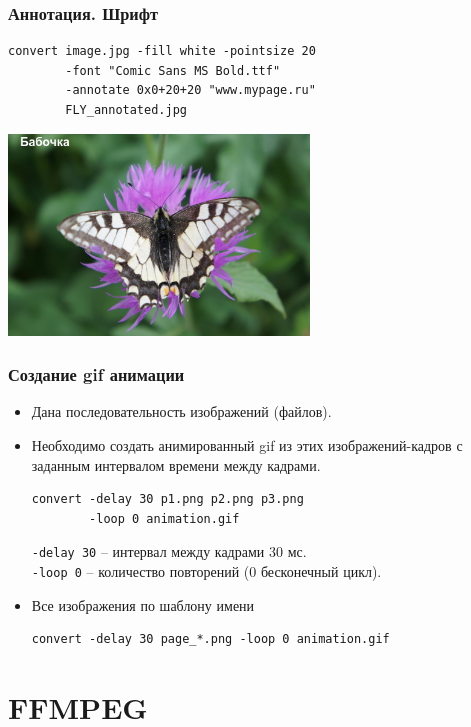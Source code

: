 \documentclass[11pt, compress]{beamer}
\newcommand{\code}[1]{\textcolor{dark-green}{\texttt{#1}}}
\begin{document}
\begin{frame}[c, fragile]
\frametitle{Аннотация. Шрифт}
\begin{lstlisting}
convert image.jpg -fill white -pointsize 20
        -font "Comic Sans MS Bold.ttf"
        -annotate 0x0+20+20 "www.mypage.ru" 
        FLY_annotated.jpg
\end{lstlisting}
\includegraphics[width=0.6\textwidth]{FLY_annotated4.jpg}
\end{frame}


\begin{frame}[c, fragile]
\frametitle{Создание gif анимации}
\begin{itemize}
	\item Дана последовательность изображений (файлов).
	\item Необходимо создать анимированный gif из этих изображений-кадров с заданным интервалом времени между кадрами.
\begin{lstlisting}
convert -delay 30 p1.png p2.png p3.png 
        -loop 0 animation.gif
\end{lstlisting}	
  \code{-delay 30} -- интервал между кадрами 30 мс.\\
  \code{-loop 0} -- количество повторений (0 бесконечный цикл).
  \item Все изображения по шаблону имени
\begin{lstlisting}
convert -delay 30 page_*.png -loop 0 animation.gif
\end{lstlisting}  
\end{itemize}

\end{frame}


%
\section{FFMPEG}
%
\end{document}
